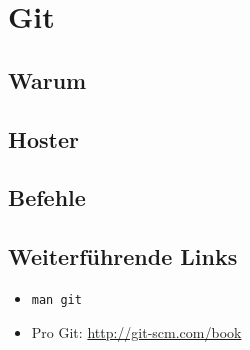 \chapter{Git}
\section{Warum}
\section{Hoster}
\section{Befehle}
\section{Weiterführende Links}
\begin{itemize}
  \item \texttt{man git}
  \item Pro Git: \href{http://git-scm.com/book}{http://git-scm.com/book}
\end{itemize}
